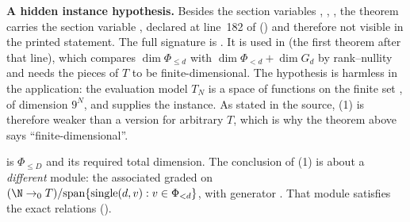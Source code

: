 \begin{dictionary}
\textbf{A hidden instance hypothesis.} Besides the section variables , , , the theorem
 carries the section variable \lean{[FiniteDimensional ℂ T]}, declared at line~182 of
 () and therefore not visible in the printed statement.
The full signature is
. It is used in
 (the first theorem after that  line), which compares $\dim\Phi_{\le d}$ with
$\dim\Phi_{<d}+\dim G_d$ by rank--nullity and needs the pieces of $T$ to be finite-dimensional. The hypothesis is harmless in
the application: the evaluation model $T_N$ is a space of functions on the finite set , of dimension $9^N$, and
 supplies the instance. As stated in the source, (1) is therefore weaker than a version for
arbitrary $T$, which is why the theorem above says ``finite-dimensional''.

 is $\Phi_{\le D}$ and  its required total dimension. The conclusion of (1) is about a
\emph{different} module: the associated graded  on $(\N\to_0T)/\mathrm{span}\{\text{single}(d,v):v\in\Phi_{<d}\}$,
with generator . That module satisfies the exact relations  ().
\end{dictionary}

